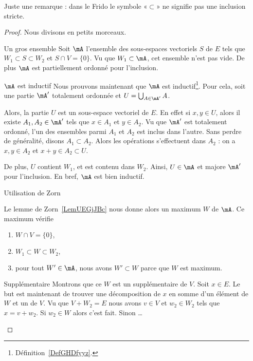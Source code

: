 Juste une remarque : dans le Frido le symbole «\( \subset\)» ne signifie pas une inclusion stricte.

\begin{proof}
    Nous divisons en petits morceaux.
    \begin{subproof}
        \item[Un gros ensemble]
            Soit \( \mA\) l'ensemble des sous-espaces vectoriels \( S\) de \( E\) tels que \( W_1\subset S\subset W_2\) et \( S\cap V=\{ 0 \}\). Vu que \( W_1\subset \mA\), cet ensemble n'est pas vide. De plus \( \mA\) est partiellement ordonné pour l'inclusion.
        \item[\( \mA\) est inductif]
            Nous prouvons maintenant que \( \mA\) est inductif\footnote{Définition~\ref{DefGHDfyyz}.}. Pour cela, soit une partie \( \mA'\) totalement ordonnée et \( U=\bigcup_{A\in \mA'}A\).

            Alors, la partie \( U\) est un sous-espace vectoriel de \( E\). En effet si \( x,y\in U\), alors il existe \( A_1,A_2\in\mA'\) tels que \( x\in A_1\) et \( y\in A_2\). Vu que \( \mA'\) est totalement ordonné, l'un des ensembles parmi \( A_1\) et \( A_2\) est inclus dans l'autre. Sans perdre de généralité, disons \( A_1\subset A_2\). Alors les opérations s'effectuent dans \( A_2 \) : on a \( x,y\in A_2\) et \( x+y\in A_2\subset U\).

            De plus, \( U \) contient \( W_1 \), et est contenu dans \( W_2\). Ainsi, \( U\in \mA\) et majore \( \mA'\) pour l'inclusion. En bref, \( \mA\) est bien inductif.
        \item[Utilisation de Zorn]

            Le lemme de Zorn~\ref{LemUEGjJBc} nous donne alors un maximum \( W\) de \( \mA\). Ce maximum vérifie
            \begin{enumerate}
                \item
                    \( W\cap V=\{ 0 \}\),
                \item
                    \( W_1\subset W\subset W_2\),
                \item
                    pour tout \( W'\in\mA\), nous avons \( W'\subset W\) parce que \( W\) est maximum.
            \end{enumerate}
        \item[Supplémentaire]
            Montrons que ce \( W\) est un supplémentaire de \( V\). Soit \( x\in E\). Le but est maintenant de trouver une décomposition de \( x\) en somme d'un élément de \( W\) et un de \( V\). Vu que \( V+W_2=E\) nous avons \( v\in V\) et \( w_2\in W_2\) tels que \( x=v+w_2\). Si \( w_2\in W\) alors c'est fait. Sinon \ldots


\end{subproof}
\end{proof}
